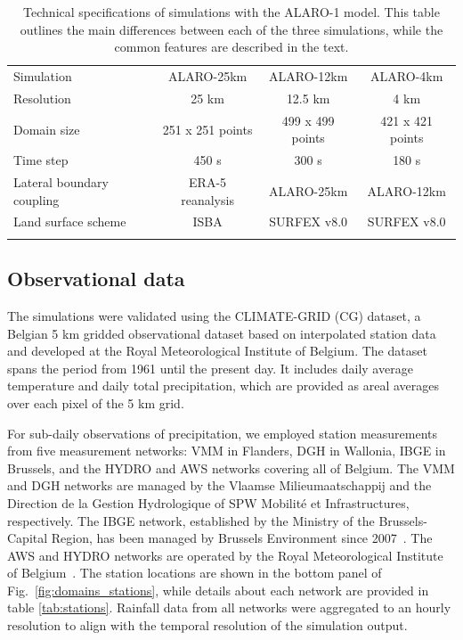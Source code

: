 \documentclass[journal abbreviation, manuscript]{copernicus}
\begin{document}
\begin{table}[t]
\caption{Technical specifications of simulations with the ALARO-1 model. This table outlines the main differences between each of the three simulations, while the common features are described in the text.}
\begin{tabular}{lccc}
\tophline
Simulation & ALARO-25km & ALARO-12km & ALARO-4km \\
\middlehline
Resolution & 25 km & 12.5 km & 4 km \\
Domain size & 251 x 251 points & 499 x 499 points & 421 x 421 points \\
Time step & 450 s & 300 s & 180 s \\
Lateral boundary coupling & ERA-5 reanalysis & ALARO-25km & ALARO-12km \\
Land surface scheme & ISBA & SURFEX v8.0 & SURFEX v8.0 \\
\bottomhline
\end{tabular}
\belowtable{} \label{tab:technical}
\end{table}

\subsection{Observational data}
\label{sect:obs}

The simulations were validated using the CLIMATE-GRID (CG) dataset, a Belgian 5 km gridded observational dataset based on interpolated station data and developed at the Royal Meteorological Institute of Belgium. 
The dataset spans the period from 1961 until the present day.
It includes daily average temperature and daily total precipitation, which are provided as areal averages over each pixel of the 5 km grid. 

For sub-daily observations of precipitation, we employed station measurements from five measurement networks: VMM in Flanders, DGH in Wallonia, IBGE in Brussels, and the HYDRO and AWS networks covering all of Belgium. 
The VMM and DGH networks are managed by the Vlaamse Milieumaatschappij and the Direction de la Gestion Hydrologique of SPW Mobilité et Infrastructures, respectively. 
The IBGE network, established by the Ministry of the Brussels-Capital Region, has been managed by Brussels Environment since 2007~\citep{dehem2010validation, journee2014validation}. 
The AWS and HYDRO networks are operated by the Royal Meteorological Institute of Belgium~\citep{van_de_vyver_observed_2021}.
The station locations are shown in the bottom panel of Fig.~\ref{fig:domains_stations}, while details about each network are provided in table \ref{tab:stations}.
Rainfall data from all networks were aggregated to an hourly resolution to align with the temporal resolution of the simulation output.
\end{document}
